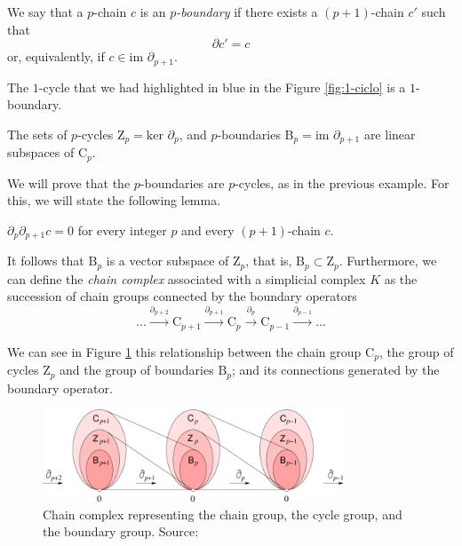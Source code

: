 \documentclass[../main.tex]{subfiles}
\begin{document}
\begin{definition}
\begin{sloppypar}
We say that a $p$-chain $c$ is an \emph{$p$-boundary} if there exists a $(p+1)$-chain $c'$ such that
\[
\partial c' = c
\]
or, equivalently, if $c \in \text{im }\partial_{p+1}$.
\end{sloppypar}
\end{definition}

\begin{exmp}
The $1$-cycle that we had highlighted in blue in the Figure \ref{fig:1-ciclo} is a $1$-boundary.
\end{exmp}

\begin{remark}
The sets of $p$-cycles $\text{Z}_p = \text{ker }\partial_p$, and $p$-boundaries $\text{B}_p = \text{im }\partial_{p+1} $ are linear subspaces of $\text{C}_p$.
\end{remark}

We will prove that the $p$-boundaries are $p$-cycles, as in the previous example. For this, we will state the following lemma.

\begin{lemma}
$\partial_p \partial_{p+1} c = 0$ for every integer $p$ and every $(p + 1)$-chain $c$.
\end{lemma}

It follows that $\text{B}_p$ is a vector subspace of $\text{Z}_p$, that is, $\text{B}_p \subset \text{Z}_p$. Furthermore, we can define the \emph{chain complex} associated with a simplicial complex $K$ as the succession of chain groups connected by the boundary operators
\[
...\overset{\partial_{p+2}}{\longrightarrow}\text{C}_{p+1}\overset{\partial_{p+1}}{\longrightarrow}\text{C}_ {p}\overset{\partial_{p}}{\longrightarrow}\text{C}_{p-1}\overset{\partial_{p-1}}{\longrightarrow}...
\]

We can see in Figure \ref{fig:gruposCadenasOpBorde} this relationship between the chain group $\text{C}_p$, the group of cycles $\text{Z}_p$ and the group of boundaries $\text{B}_p $; and its connections generated by the boundary operator.

\begin{figure}[!ht]
\centering
\includegraphics[width=0.8\textwidth]{figures/bg/chain_complex.png} 
\caption{Chain complex representing the chain group, the cycle group, and the boundary group. Source: \cite{edelsbrunner_computational_2010}}
\label{fig:gruposCadenasOpBorde}
\end{figure}
\end{document}
